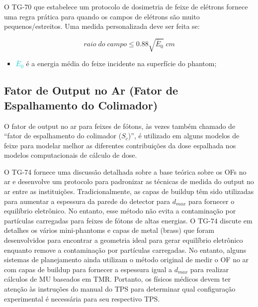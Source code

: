 \documentclass[11pt,a4paper]{article}
\newcounter{exemplo}
\begin{document}
	O TG-70 que estabelece um protocolo de dosimetria de feixe de elétrons fornece uma regra prática para quando os campos de elétrons são muito pequenos/estreitos. Uma medida personalizada deve ser feita se:

		\begin{equation}
			raio \; do \; campo \leq 0.88 \sqrt{\bar{E}_0} \; cm
		\end{equation}

	\begin{exemplo}[onde:]
		\begin{itemize}[label=\textcolor{CarnationPink}{$\star$}]
			\item \textcolor{DarkTurquoise}{$\bar{E}_0$} é a energia média do feixe incidente na superfície do phantom;
		\end{itemize}
	\end{exemplo}

	\begin{figure}[h]
		\centering
	\end{figure}

\subsection*{Fator de Output no Ar (Fator de Espalhamento do Colimador)}

	O fator de output no ar para feixes de fótons, às vezes também chamado de “fator de espalhamento do colimador ($S_c$)”, é utilizado em alguns modelos de feixe para modelar melhor as diferentes contribuições da dose espalhada nos modelos computacionais de cálculo de dose. 

	O TG-74 fornece uma discussão detalhada sobre a base teórica sobre os OFs no ar e desenvolve um protocolo para padronizar as técnicas de medida do output no ar entre as instituições. Tradicionalmente, as capas de buildup têm sido utilizadas para aumentar a espessura da parede do detector para $d_{max}$ para fornecer o equilíbrio eletrônico. No entanto, esse método não evita a contaminação por partículas carregadas para feixes de fótons de altas energias. O TG-74 discute em detalhes os vários mini-phantoms e capas de metal (brass) que foram desenvolvidos para encontrar a geometria ideal para gerar equilíbrio eletrônico enquanto remove a contaminação por partículas carregadas. No entanto, alguns sistemas de planejamento ainda utilizam o método original de medir o OF no ar com capas de buildup para fornecer a espessura igual a $d_{max}$ para realizar cálculos de MU baseados em TMR. Portanto, os físicos médicos devem ter atenção às instruções do manual do TPS para determinar qual configuração experimental é necessária para seu respectivo TPS.
\end{document}

